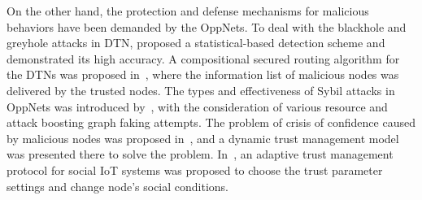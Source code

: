 On the other hand, 
the protection and defense mechanisms for malicious behaviors have
been demanded by the OppNets.
To deal with the blackhole and greyhole attacks
in DTN,
\cite{Pham2016Detecting} proposed a statistical-based detection scheme and
demonstrated its high accuracy. 
A compositional secured routing algorithm for the DTNs
was proposed in~\cite{Saha2018Design},
where the information list of malicious nodes was delivered by the trusted nodes.
The types and effectiveness of Sybil attacks in OppNets
was introduced by~\cite{Sacha2016Stalk},
with the consideration of various resource and 
attack boosting graph faking attempts.
The problem of crisis of confidence caused by malicious nodes
was proposed in~\cite{Yao2016Secure}, 
and a dynamic trust management model 
was presented there to solve the problem.
In~\cite{Chen2016Trust},
an adaptive trust management
protocol for social IoT systems was proposed 
to choose the trust parameter settings and change node's social conditions. 
%
